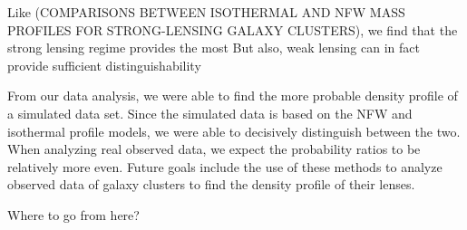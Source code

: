 \documentclass[10pt]{article}
\begin{document}
Like (COMPARISONS BETWEEN ISOTHERMAL AND NFW MASS PROFILES
FOR STRONG-LENSING GALAXY CLUSTERS), we find that the strong lensing regime provides the most
But also, weak lensing can in fact provide sufficient distinguishability


From our data analysis, we were able to find the more probable density profile of a simulated data set.
Since the simulated data is based on the NFW and isothermal profile models, we were able to decisively distinguish between the two.
When analyzing real observed data, we expect the probability ratios to be relatively more even.
Future goals include the use of these methods to analyze observed data of galaxy clusters to find the density profile of their lenses.

Where to go from here?




\end{document}
